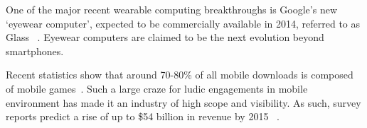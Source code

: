 One of the major recent wearable computing breakthroughs is Google’s new ‘eyewear computer’, expected to be commercially available in 2014, referred to as Glass ~\cite{googleglass}. Eyewear computers are claimed to be the next evolution beyond smartphones.
 
Recent statistics show that around 70-80\% of all mobile downloads is composed of mobile games~\cite{statistics,infographic}. Such a large craze for ludic engagements in mobile environment has made it an industry of high scope and visibility. As such, survey reports predict a rise of up to \$54 billion in revenue by 2015 ~\cite{statistics,infographic}.

